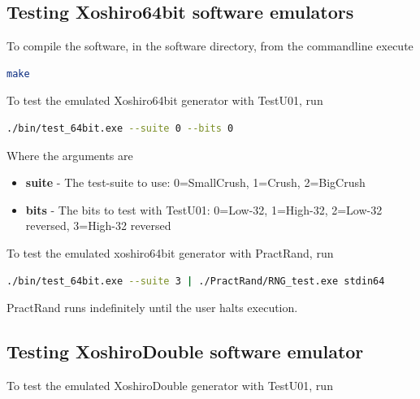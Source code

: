 \documentclass{article}
\begin{document}
\subsection{Testing Xoshiro64bit software emulators}

To compile the software, in the software directory, from the commandline execute

\begin{minipage}{1.0\textwidth}
\centering
\begin{lstlisting}[language=bash , label=lst:Make]
make
\end{lstlisting}
\end{minipage}

To test the emulated Xoshiro64bit generator with TestU01, run

\begin{minipage}{1.0\textwidth}
\centering
\begin{lstlisting}[language=bash, label=lst:SwTestU01]
./bin/test_64bit.exe --suite 0 --bits 0 
\end{lstlisting}
\end{minipage}

Where the arguments are

\begin{itemize}
\item \textbf{suite} - The test-suite to use: 0=SmallCrush, 1=Crush, 2=BigCrush 
\item \textbf{bits} - The bits to test with TestU01: 0=Low-32, 1=High-32, 2=Low-32 reversed, 3=High-32 reversed
\end{itemize}

To test the emulated xoshiro64bit generator with PractRand, run

\begin{minipage}{1.0\textwidth}
\centering
\begin{lstlisting}[language=bash, label=lst:SwPractRand]
./bin/test_64bit.exe --suite 3 | ./PractRand/RNG_test.exe stdin64 
\end{lstlisting}
\end{minipage}

PractRand runs indefinitely until the user halts execution.

\subsection{Testing XoshiroDouble software emulator}

To test the emulated XoshiroDouble generator with TestU01, run
\end{document}
